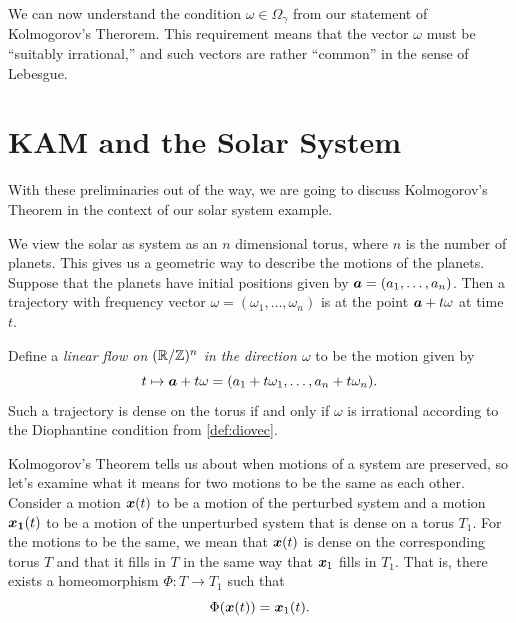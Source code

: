 \documentclass[twoside,letterpaper,10pt]{article}
\numberwithin{equation}{section}
\begin{document}
We can now understand the condition $\omega \in \Omega_{\gamma}$ from our
statement of Kolmogorov's Therorem.
This requirement means that the vector $\omega$ must be ``suitably irrational,''
and such vectors are rather ``common'' in the sense of Lebesgue.


\section{KAM and the Solar System}
\label{sec:kam-solar-system}

With these preliminaries out of the way, we are going to discuss Kolmogorov's
Theorem in the context of our solar system example.

We view the solar as system as an $n$ dimensional torus, where $n$ is the number
of planets.
This gives us a geometric way to describe the motions of the planets.
Suppose that the planets have initial positions given by $\bm{a} = (a_1, \ldots,
a_n)$.
Then a trajectory with frequency vector $\omega = (\omega_1, \ldots, \omega_n)$
is at the point $\bm{a} + t \omega$ at time $t$.

Define a \emph{linear flow on $(\mathbb{R}/\mathbb{Z})^n$ in the direction $\omega$} to be the
motion given by
\begin{equation*}
  t \mapsto \bm{a} + t \omega = (a_1 + t \omega_1, \ldots, a_n + t \omega_n).
\end{equation*}
Such a trajectory is dense on the torus if and only if $\omega$ is irrational
according to the Diophantine condition from \cref{def:diovec}.

Kolmogorov's Theorem tells us about when motions of a system are preserved, so
let's examine what it means for two motions to be the same as each other.
Consider a motion $\bm{x}(t)$ to be a motion of the perturbed system and a
motion $\bm{x_1}(t)$ to be a motion of the unperturbed system that is dense on a
torus $T_1$.
For the motions to be the same, we mean that $\bm{x}(t)$ is dense on the
corresponding torus $T$ and that it fills in $T$ in the same way that $\bm{x}_1$
fills in $T_1$.
That is, there exists a homeomorphism $\Phi : T \to T_1$ such that
\begin{equation*}
  \Phi(\bm{x}(t)) = \bm{x}_1(t).
\end{equation*}
\end{document}
